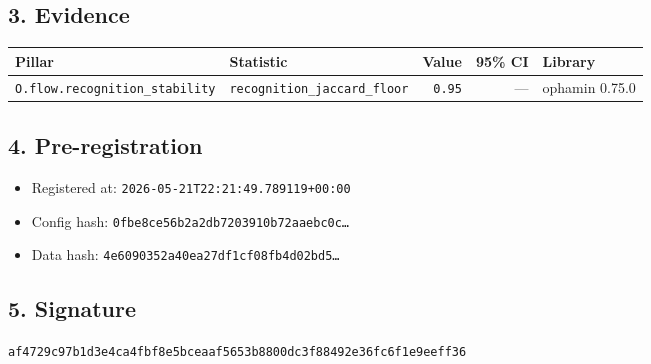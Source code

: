 \documentclass{article}
\begin{document}
\subsection*{3. Evidence}
\begin{tabular}{llrrl}\toprule
\textbf{Pillar} & \textbf{Statistic} & \textbf{Value} & \textbf{95\% CI} & \textbf{Library} \\\midrule
\texttt{O.flow.recognition\_stability} & \texttt{recognition\_jaccard\_floor} & \texttt{0.95} & --- & ophamin 0.75.0 \\
\bottomrule\end{tabular}
\subsection*{4. Pre-registration}
\begin{itemize}
\item Registered at: \texttt{2026-05-21T22:21:49.789119+00:00}
\item Config hash: \texttt{0fbe8ce56b2a2db7203910b72aaebc0c\dots}
\item Data hash: \texttt{4e6090352a40ea27df1cf08fb4d02bd5\dots}
\end{itemize}
\subsection*{5. Signature}
\texttt{af4729c97b1d3e4ca4fbf8e5bceaaf5653b8800dc3f88492e36fc6f1e9eeff36}\\
\end{document}
